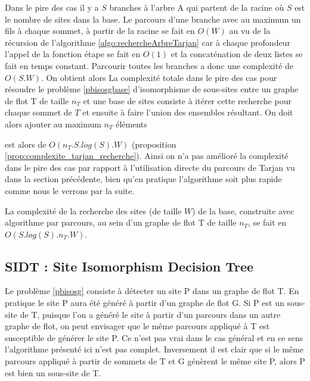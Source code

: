 Dans le pire des cas il y a $S$ branches à l'arbre A qui partent de la racine où $S$ est le nombre de sites dans la base. Le parcours d'une branche avec au maximum un fils à chaque sommet, à partir de la racine se fait en $O(W)$ au vu de la récursion de l'algorithme \ref{algo:rechercheArbreTarjan} car à chaque profondeur l'appel de la fonction étape se fait en $O(1)$ et la concaténation de deux listes se fait en temps constant.
Parcourir toutes les branches a donc une complexité de $O(S.W)$. 
On obtient alors
La complexité totale dans le pire des cas pour résoudre le problème \ref{pbisosgbase} d'isomorphisme de sous-sites entre un graphe de flot T de taille $n_T$ et une base de sites consiste à itérer cette recherche pour chaque sommet de $T$ et ensuite à faire l'union des ensembles résultant. On doit alors ajouter au maximum $n_T$ éléments 


est alors de $O(n_T.S.log(S).W)$ (proposition \ref{prop:complexite_tarjan_recherche}). Ainsi on n'a pas amélioré la complexité dans le pire des cas par rapport à l'utilisation directe du parcours de Tarjan vu dans la section précédente, bien qu'en pratique l'algorithme soit plus rapide comme nous le verrons par la suite.

\begin{prop}
 La complexité de la recherche des sites (de taille $W$) de la base, construite avec algorithme par parcours, au sein d'un graphe de flot T de taille $n_T$, se fait en $O(S.log(S).n_T.W)$.
\label{prop:complexite_tarjan_recherche}
\end{prop}


\FloatBarrier
\subsection{SIDT : Site Isomorphism Decision Tree}
Le problème \ref{pbisosg} consiste à détecter un site P dans un graphe de flot T. En pratique le site P aura été généré à partir d'un graphe de flot G. Si P est un sous-site de T, puisque l'on a généré le site à partir d'un parcours dans un autre graphe de flot, on peut envisager que le même parcours appliqué à T est susceptible de générer le site P. Ce n'est pas vrai dans le cas général et en ce sens l'algorithme présenté ici n'est pas complet.
Inversement il est clair que si le même parcours appliqué à partir de sommets de T et G génèrent le même site P, alors P est bien un sous-site de T.

